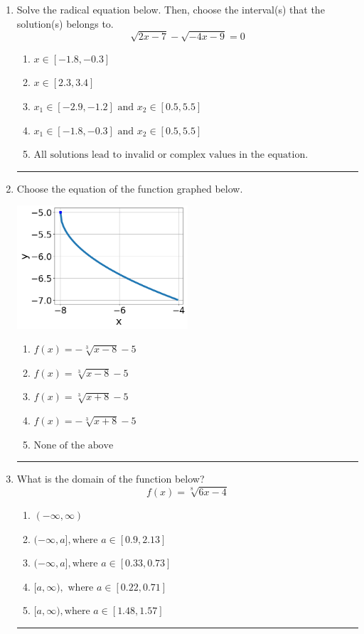 \documentclass[14pt]{extbook}
\newcommand{\litem}[1]{\item#1\hspace*{-1cm}\rule{\textwidth}{0.4pt}}
\begin{document}
\begin{enumerate}
{\begin{enumerate}[label=\Alph*.]
\end{enumerate} }
\litem{
Solve the radical equation below. Then, choose the interval(s) that the solution(s) belongs to.\[ \sqrt{2 x - 7} - \sqrt{-4 x - 9} = 0 \]\begin{enumerate}[label=\Alph*.]
\item \( x \in [-1.8,-0.3] \)
\item \( x \in [2.3,3.4] \)
\item \( x_1 \in [-2.9, -1.2] \text{ and } x_2 \in [0.5,5.5] \)
\item \( x_1 \in [-1.8, -0.3] \text{ and } x_2 \in [0.5,5.5] \)
\item \( \text{All solutions lead to invalid or complex values in the equation.} \)

\end{enumerate} }
\litem{
Choose the equation of the function graphed below.
\begin{center}
    \includegraphics[width=0.5\textwidth]{../Figures/radicalGraphToEquationC.png}
\end{center}
\begin{enumerate}[label=\Alph*.]
\item \( f(x) = - \sqrt[3]{x - 8} - 5 \)
\item \( f(x) = \sqrt[3]{x - 8} - 5 \)
\item \( f(x) = \sqrt[3]{x + 8} - 5 \)
\item \( f(x) = - \sqrt[3]{x + 8} - 5 \)
\item \( \text{None of the above} \)

\end{enumerate} }
\litem{
What is the domain of the function below?\[ f(x) = \sqrt[8]{6 x - 4} \]\begin{enumerate}[label=\Alph*.]
\item \( (-\infty, \infty) \)
\item \( (-\infty, a], \text{where } a \in [0.9, 2.13] \)
\item \( (-\infty, a], \text{where } a \in [0.33, 0.73] \)
\item \( [a, \infty), \text{ where } a \in [0.22, 0.71] \)
\item \( [a, \infty), \text{where } a \in [1.48, 1.57] \)


\end{enumerate}}
\end{enumerate}
\end{document}
